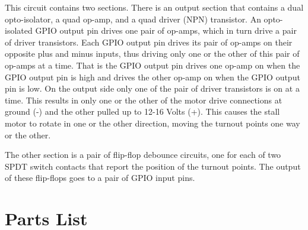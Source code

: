 This circuit contains two sections.  There is an output section that contains 
a dual opto-isolator, a quad op-amp, and a quad driver (NPN) transistor.  An 
opto-isolated GPIO output pin drives one pair of op-amps, which in turn drive 
a pair of driver transistors.  Each GPIO output pin drives its pair of op-amps 
on their opposite plus and minus inputs, thus driving only one or the other of 
this pair of op-amps at a time.  That is the GPIO output pin drives one op-amp 
on when the GPIO output pin is high and drives the other op-amp on when the 
GPIO output pin is low.  On the output side only one of the pair of driver 
transistors is on at a time.  This results in only one or the other of the 
motor drive connections at ground (-) and the other pulled up to 12-16 Volts 
(+).  This causes the stall motor to rotate in one or the other direction, 
moving the turnout points one way or the other.

The other section is a pair of flip-flop debounce circuits, one for each of 
two SPDT switch contacts that report the position of the turnout points.  The 
output of these flip-flops goes to a pair of GPIO input pins.

\section{Parts List}

